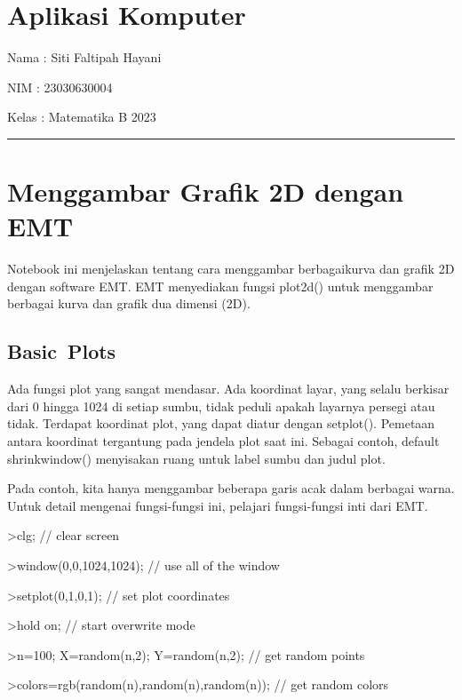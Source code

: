 \documentclass[
]{book}
\author{}
\date{}
\begin{document}
\frontmatter

\mainmatter
\chapter{Aplikasi Komputer}\label{aplikasi-komputer}

Nama : Siti Faltipah Hayani

NIM : 23030630004

Kelas : Matematika B 2023

\begin{center}\rule{0.5\linewidth}{0.5pt}\end{center}

\chapter{Menggambar Grafik 2D dengan EMT}\label{menggambar-grafik-2d-dengan-emt}

Notebook ini menjelaskan tentang cara menggambar berbagaikurva dan grafik 2D dengan software EMT. EMT menyediakan fungsi plot2d() untuk menggambar berbagai kurva dan grafik dua dimensi (2D).

\section{Basic~Plots}\label{basic-plots}

Ada fungsi plot yang sangat mendasar. Ada koordinat layar, yang selalu berkisar dari 0 hingga 1024 di setiap sumbu, tidak peduli apakah layarnya persegi atau tidak. Terdapat koordinat plot, yang dapat diatur dengan setplot(). Pemetaan antara koordinat tergantung pada jendela plot saat ini. Sebagai contoh, default shrinkwindow() menyisakan ruang untuk label sumbu dan judul plot.

Pada contoh, kita hanya menggambar beberapa garis acak dalam berbagai warna. Untuk detail mengenai fungsi-fungsi ini, pelajari fungsi-fungsi inti dari EMT.

\textgreater clg; // clear screen

\textgreater window(0,0,1024,1024); // use all of the window

\textgreater setplot(0,1,0,1); // set plot coordinates

\textgreater hold on; // start overwrite mode

\textgreater n=100; X=random(n,2); Y=random(n,2); // get random points

\textgreater colors=rgb(random(n),random(n),random(n)); // get random colors
\end{document}

